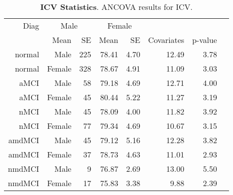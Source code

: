 \documentclass[12pt]{article}
\newcommand\T{\rule{0pt}{2.6ex}}
\begin{document}
\newpage
\begin{table}[h]
	\centering
	\footnotesize
	\begin{tabular}{rrrrrrrr}
	\hline
	Diag\T & \multicolumn{2}{c}{Male} & \multicolumn{2}{c}{Female} & & &  \\
      	&  Mean & SE                & Mean & SE                  & Covariates & p-value & \\ \hline
  \hline
normal & Male & 225 & 78.41 & 4.70 & 12.49 & 3.78 \\ 
  normal & Female & 328 & 78.67 & 4.91 & 11.09 & 3.03 \\ 
  aMCI & Male &  58 & 79.18 & 4.69 & 12.71 & 4.00 \\ 
  aMCI & Female &  45 & 80.44 & 5.22 & 11.27 & 3.19 \\ 
  nMCI & Male &  45 & 78.09 & 4.00 & 11.82 & 3.92 \\ 
  nMCI & Female &  77 & 79.34 & 4.69 & 10.67 & 3.15 \\ 
  amdMCI & Male &  45 & 79.12 & 5.16 & 12.28 & 3.82 \\ 
  amdMCI & Female &  37 & 78.73 & 4.63 & 11.01 & 2.93 \\ 
  nmdMCI & Male &   9 & 76.87 & 2.69 & 13.00 & 5.50 \\ 
  nmdMCI & Female &  17 & 75.83 & 3.38 & 9.88 & 2.39 \\ 
   \hline

  \end{tabular}
	\caption{\textbf{ICV Statistics}.  ANCOVA results for ICV.}
	\label{Wave1.ICV.stats}
\end{table}
\end{document}
